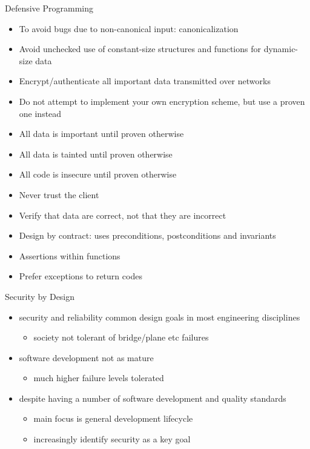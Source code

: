 \documentclass{beamer}
\begin{document}
\begin{frame}{Defensive Programming}
  \begin{itemize}
    \item To avoid bugs due to non-canonical input: canonicalization
    \item Avoid unchecked use of constant-size structures and
      functions for dynamic-size data
    \item Encrypt/authenticate all important data transmitted over
      networks
    \item Do not attempt to implement your own encryption scheme, but
      use a proven one instead
    \item All data is important until proven otherwise
    \item All data is tainted until proven otherwise
    \item All code is insecure until proven otherwise
    \item Never trust the client
    \item Verify that data are correct, not that they are incorrect
    \item Design by contract: uses preconditions, postconditions and invariants
    \item Assertions within functions
    \item Prefer exceptions to return codes
  \end{itemize}
\end{frame}







\begin{frame}{Security by Design}
  \begin{itemize}
  \item security and reliability common design goals in
    most engineering disciplines
    \begin{itemize}
    \item society not tolerant of bridge/plane etc failures
    \end{itemize}

  \item software development not as mature
    \begin{itemize}
    \item much higher failure levels tolerated
    \end{itemize}

  \item despite having a number of software
development and quality standards
    \begin{itemize}
    \item main focus is general development lifecycle
    \item increasingly identify security as a key goal
    \end{itemize}
  \end{itemize}
\end{frame}
\end{document}
